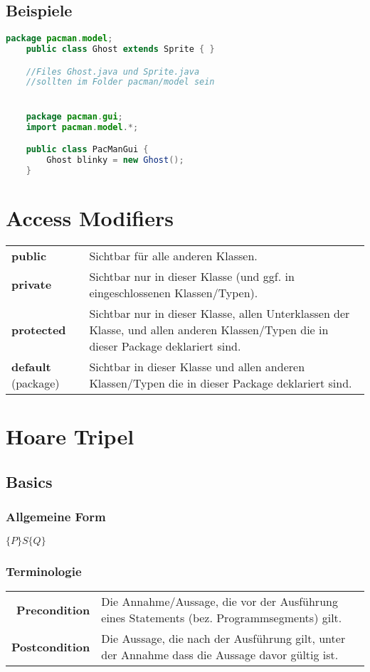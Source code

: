 \documentclass[12pt,a4paper]{article}
\begin{document}
\subsection{Beispiele}
\begin{lstlisting}[language=Java]
	package pacman.model;
	public class Ghost extends Sprite { }

	//Files Ghost.java und Sprite.java
	//sollten im Folder pacman/model sein


	package pacman.gui;
	import pacman.model.*;

	public class PacManGui {
		Ghost blinky = new Ghost();
	}
\end{lstlisting}
\newpage
\section{Access Modifiers}
\begin{tabularx}{\linewidth}{ l X }
\textbf{public} & Sichtbar für alle anderen Klassen.\\
\textbf{private} & Sichtbar nur in dieser Klasse (und ggf. in eingeschlossenen Klassen/Typen).\\
\textbf{protected} & Sichtbar nur in dieser Klasse, allen Unterklassen der Klasse, und allen anderen Klassen/Typen die in dieser Package deklariert sind.\\
\textbf{default} (package) & Sichtbar in dieser Klasse und allen anderen Klassen/Typen die in dieser Package deklariert sind.
\end{tabularx}
\section{Hoare Tripel}
\subsection{Basics} %
\subsubsection{Allgemeine Form}
$\{P\} S \{Q\}$
\subsubsection{Terminologie}
\begin{tabularx}{\linewidth}{r X}
\textbf{Precondition} & Die Annahme/Aussage, die vor der Ausführung eines Statements (bez. Programmsegments) gilt.\\
\textbf{Postcondition} & Die Aussage, die nach der Ausführung gilt, unter der Annahme dass die Aussage davor gültig ist.
\end{tabularx}
\end{document}
